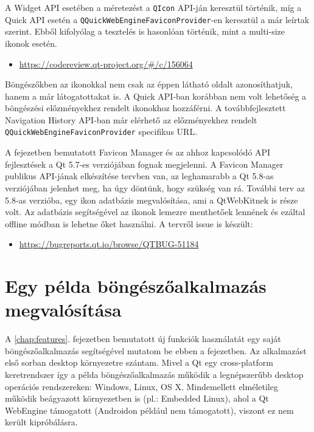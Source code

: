 \documentclass[12pt]{report}
\let\origurl\url
\renewcommand{\url}[1]{%
    \textcolor{blue}{\origurl{#1}}
}
\newcommand{\gerrit}[1]{%
    \textcolor{qtgreen}{\origurl{https://codereview.qt-project.org/\#/c/#1}}
}
\newcommand{\qtbug}[1]{%
    \textcolor{qtred}{\origurl{https://bugreports.qt.io/browse/QTBUG-#1}}
}
\begin{document}
A Widget API esetében a méretezést a \texttt{QIcon} API-ján keresztül történik, míg a
Quick API esetén a \texttt{QQuickWebEngineFaviconProvider}-en keresztül a már leírtak
szerint. Ebből kifolyólag a tesztelés is hasonlóan történik, mint a multi-size ikonok
esetén.

\begin{center}
    \begin{reviewbox}
        \begin{itemize}
            \renewcommand{\labelitemi}{\textcolor{qtgreen}{$\blacktriangleright$}}
            \item \gerrit{156064}
        \end{itemize}
    \end{reviewbox}
\end{center}

Böngészőkben az ikonokkal nem csak az éppen látható oldalt azonosíthatjuk, hanem a már
látogatottakat is. A Quick API-ban korábban nem volt lehetőség a böngészési előzményekhez
rendelt ikonokhoz hozzáférni. A továbbfejlesztett Navigation History API-ban már elérhető
az előzményekhez rendelt \texttt{QQuickWebEngineFaviconProvider} specifikus URL.

A fejezetben bemutatott Favicon Manager és az ahhoz kapcsolódó API fejlesztések a Qt 5.7-es
verziójában fognak megjelenni. A Favicon Manager publikus API-jának elkészítése tervben van,
az leghamarabb a Qt 5.8-as verziójában jelenhet meg, ha úgy döntünk, hogy szükség van rá.
További terv az 5.8-as verzióba, egy ikon adatbázis megvalósítása, ami a QtWebKitnek is
része volt. Az adatbázis segítségével az ikonok lemezre menthetőek lennének és ezáltal offline
módban is lehetne őket használni. A tervről issue is készült:
\begin{center}
    \begin{issuebox}
        \begin{itemize}
            \renewcommand{\labelitemi}{\textcolor{qtred}{$\blacktriangleright$}}
            \item \qtbug{51184}
        \end{itemize}
    \end{issuebox}
\end{center}


\chapter{Egy példa böngészőalkalmazás megvalósítása}

A \ref{chap:features}. fejezetben bemutatott új funkciók használatát egy saját
böngészőalkalmazás segítségével mutatom be ebben a fejezetben. Az alkalmazást első sorban
desktop környezetre szántam. Mivel a Qt egy cross-platform keretrendszer így a példa
böngészőalkalmazás működik a legnépszerűbb desktop operációs rendszereken: Windows, Linux,
OS X. Mindemellett elméletileg működik beágyazott környezetben is (pl.: Embedded Linux),
ahol a Qt WebEngine támogatott (Androidon például nem támogatott), viszont ez nem került
kipróbálásra.
\end{document}

